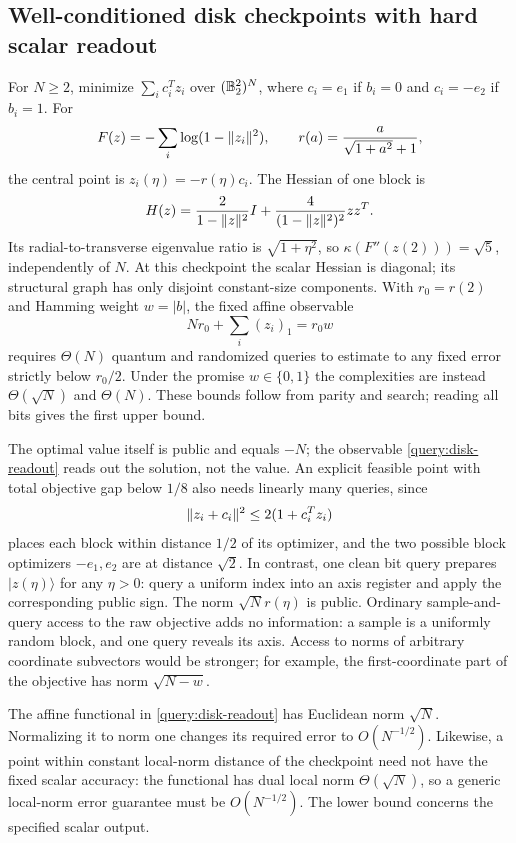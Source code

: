 \subsection{Well-conditioned disk checkpoints with hard scalar readout}
For $N\geq2$, minimize $\sum_i c_i^Tz_i$ over $(\mathbb B_2^2)^N$, where
$c_i=e_1$ if $b_i=0$ and $c_i=-e_2$ if $b_i=1$. For
\[
 F(z)=-\sum_i\log(1-\lVert z_i\rVert^2),\qquad
 r(a)=\frac{a}{\sqrt{1+a^2}+1},
\]
the central point is $z_i(\eta)=-r(\eta)c_i$. The
Hessian of one block is
\begin{equation}\label{query:ball-hessian}
 H(z)=\frac2{1-\lVert z\rVert^2}I+
       \frac4{(1-\lVert z\rVert^2)^2}zz^T.
\end{equation}
Its radial-to-transverse eigenvalue ratio is $\sqrt{1+\eta^2}$, so
$\kappa(F''(z(2)))=\sqrt5$, independently of $N$. At this checkpoint the
scalar Hessian is diagonal; its structural graph has only disjoint
constant-size components. With $r_0=r(2)$ and Hamming
weight $w=|b|$, the fixed affine observable
\begin{equation}\label{query:disk-readout}
 Nr_0+\sum_i(z_i)_1=r_0w
\end{equation}
requires $\Theta(N)$ quantum and randomized queries to estimate to any
fixed error strictly below $r_0/2$. Under the promise $w\in\{0,1\}$ the
complexities are instead $\Theta(\sqrt N)$ and $\Theta(N)$. These bounds
follow from parity and search; reading all bits gives the first upper
bound.

The optimal value itself is public and equals $-N$; the observable
\eqref{query:disk-readout} reads out the solution, not the value. An explicit feasible point with total objective gap below $1/8$
also needs linearly many queries, since
\[
 \lVert z_i+c_i\rVert^2\leq2(1+c_i^Tz_i)
\]
places each block within distance $1/2$ of its optimizer, and the two
possible block optimizers $-e_1,e_2$ are at distance $\sqrt2$.
In contrast, one clean bit query prepares $|z(\eta)\rangle$ for any
$\eta>0$: query a uniform index into an axis
register and apply the corresponding public sign. The norm
$\sqrt N r(\eta)$ is public. Ordinary sample-and-query access to the raw
objective adds no information: a sample is a uniformly random block, and
one query reveals its axis. Access to norms of arbitrary coordinate subvectors would be stronger; for example, the
first-coordinate part of the objective has norm $\sqrt{N-w}$.

The affine functional in \eqref{query:disk-readout} has Euclidean norm
$\sqrt N$. Normalizing it to norm one changes its required error to
$O(N^{-1/2})$. Likewise, a point within constant local-norm distance of
the checkpoint need not have the fixed scalar accuracy: the functional
has dual local norm $\Theta(\sqrt N)$, so a generic local-norm error
guarantee must be $O(N^{-1/2})$. The lower bound concerns the specified
scalar output.

